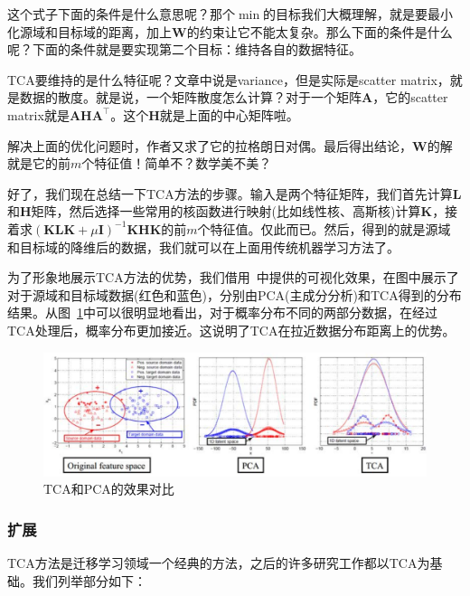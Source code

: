这个式子下面的条件是什么意思呢？那个$\min$的目标我们大概理解，就是要最小化源域和目标域的距离，加上$\mathbf{W}$的约束让它不能太复杂。那么下面的条件是什么呢？下面的条件就是要实现第二个目标：维持各自的数据特征。

TCA要维持的是什么特征呢？文章中说是variance，但是实际是scatter matrix，就是数据的散度。就是说，一个矩阵散度怎么计算？对于一个矩阵$\mathbf{A}$，它的scatter matrix就是$\mathbf{A} \mathbf{H} \mathbf{A}^\top$。这个$\mathbf{H}$就是上面的中心矩阵啦。

解决上面的优化问题时，作者又求了它的拉格朗日对偶。最后得出结论，$\mathbf{W}$的解就是它的前$m$个特征值！简单不？数学美不美？

好了，我们现在总结一下TCA方法的步骤。输入是两个特征矩阵，我们首先计算$\mathbf{L}$和$\mathbf{H}$矩阵，然后选择一些常用的核函数进行映射(比如线性核、高斯核)计算$\mathbf{K}$，接着求$({\mathbf{K}} \mathbf{L} {\mathbf{K}}+\mu \mathbf{I})^{-1}{\mathbf{K}} \mathbf{H}{\mathbf{K}}$的前$m$个特征值。仅此而已。然后，得到的就是源域和目标域的降维后的数据，我们就可以在上面用传统机器学习方法了。

为了形象地展示TCA方法的优势，我们借用~\cite{pan2011domain}中提供的可视化效果，在图中展示了对于源域和目标域数据(红色和蓝色)，分别由PCA(主成分分析)和TCA得到的分布结果。从图~\ref{fig-distribution-tca}中可以很明显地看出，对于概率分布不同的两部分数据，在经过TCA处理后，概率分布更加接近。这说明了TCA在拉近数据分布距离上的优势。

\begin{figure}[htbp]
	\centering
	\includegraphics[scale=0.6]{./figures/fig-distribution-tca.pdf}
	\caption{TCA和PCA的效果对比}
	\label{fig-distribution-tca}
\end{figure}

\subsubsection{扩展}

TCA方法是迁移学习领域一个经典的方法，之后的许多研究工作都以TCA为基础。我们列举部分如下：

